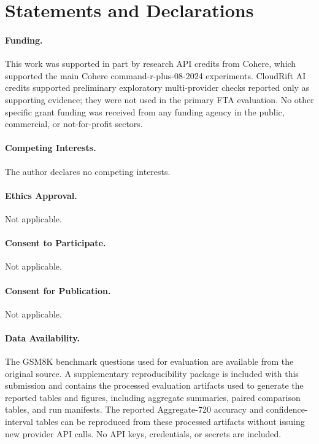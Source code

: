 \documentclass[smallcondensed]{svjour3}
\begin{document}
\section*{Statements and Declarations}

\paragraph{Funding.}
This work was supported in part by research API credits from Cohere, which
supported the main Cohere command-r-plus-08-2024 experiments. CloudRift AI
credits supported preliminary exploratory multi-provider checks reported only
as supporting evidence; they were not used in the primary FTA evaluation. No
other specific grant funding was received from any funding agency in the public,
commercial, or not-for-profit sectors.

\paragraph{Competing Interests.}
The author declares no competing interests.

\paragraph{Ethics Approval.}
Not applicable.

\paragraph{Consent to Participate.}
Not applicable.

\paragraph{Consent for Publication.}
Not applicable.

\paragraph{Data Availability.}
The GSM8K benchmark questions used for evaluation are available from the
original source. A supplementary reproducibility package is included with this
submission and contains the processed evaluation artifacts used to generate the
reported tables and figures, including aggregate summaries, paired comparison
tables, and run manifests. The reported Aggregate-720 accuracy and
confidence-interval tables can be reproduced from these processed artifacts
without issuing new provider API calls. No API keys, credentials, or secrets
are included.
\end{document}

